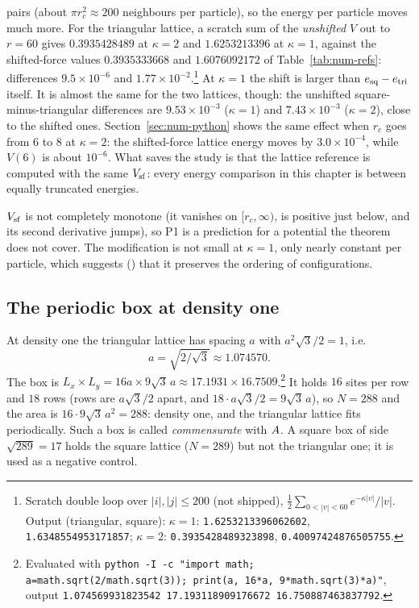 pairs (about $\pi r_c^2\approx200$ neighbours per particle), so the energy per particle moves much more. For the
triangular lattice, a scratch sum of the \emph{unshifted} $V$ out to $r=60$ gives $0.3935428489$ at $\kappa=2$ and
$1.6253213396$ at $\kappa=1$, against the shifted-force values $0.3935333668$ and $1.6076092172$ of
Table~\ref{tab:num-refs}: differences $9.5\times10^{-6}$ and $1.77\times10^{-2}$.\footnote{\label{fn:unshifted}Scratch
double loop over $|i|,|j|\le200$ (not shipped), $\frac12\sum_{0<|v|<60}e^{-\kappa|v|}/|v|$. Output (triangular, square):
$\kappa=1$: \texttt{1.6253213396062602}, \texttt{1.6348554953171857}; $\kappa=2$: \texttt{0.3935428489323898},
\texttt{0.40097424876505755}.} At $\kappa=1$ the shift is larger than $e_{\rm sq}-e_{\rm tri}$ itself. It is almost the
same for the two lattices, though: the unshifted square-minus-triangular differences are $9.53\times10^{-3}$ ($\kappa=1$)
and $7.43\times10^{-3}$ ($\kappa=2$), close to the shifted ones. Section~\ref{sec:num-python} shows the same effect when
$r_c$ goes from 6 to 8 at $\kappa=2$: the shifted-force lattice energy moves by $3.0\times10^{-4}$, while $V(6)$ is about
$10^{-6}$. What saves the study is that the lattice reference is computed with the same $V_{\rm sf}$: every energy
comparison in this chapter is between equally truncated energies.

\begin{remark}
$V_{\rm sf}$ is not completely monotone (it vanishes on $[r_c,\infty)$, is positive just below, and its second
derivative jumps), so P1 is a prediction for a potential the theorem does not cover. The modification is not small at
$\kappa=1$, only nearly constant per particle, which suggests (\tierC) that it preserves the ordering of
configurations.
\end{remark}

\subsection{The periodic box at density one}
At density one the triangular lattice has spacing $a$ with $a^2\sqrt3/2=1$, i.e.
\begin{equation}
a=\sqrt{2/\sqrt3}\approx1.074570 .
\end{equation}
The box is $L_x\times L_y=16a\times9\sqrt3\,a\approx17.1931\times16.7509$.\footnote{Evaluated with
\texttt{python -I -c "import math; a=math.sqrt(2/math.sqrt(3)); print(a, 16*a, 9*math.sqrt(3)*a)"}, output
\texttt{1.074569931823542 17.193118909176672 16.750887463837792}.} It holds $16$ sites per row and $18$ rows (rows
are $a\sqrt3/2$ apart, and $18\cdot a\sqrt3/2=9\sqrt3\,a$), so $N=288$ and the area is
$16\cdot9\sqrt3\,a^2=288$: density one, and the triangular lattice fits periodically. Such a box is called
\emph{commensurate} with $A$. A square box of side $\sqrt{289}=17$ holds the square lattice ($N=289$) but not the
triangular one; it is used as a negative control.

